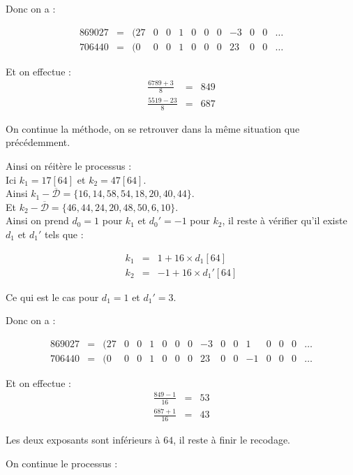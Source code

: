 \documentclass[12pt, a4paper]{memoir}
\newcommand{\dbarre}{\overline{\mathcal{D}}}
\begin{document}
Donc on a :
 
 $$\begin{array}{ccccccccccccc}
  869027 & = & (27 & 0 & 0 & 1 & 0 & 0 & 0 & -3 & 0 & 0 & \ldots \\
  706440 & = & (0 & 0 & 0 & 1 & 0 & 0 & 0 & 23 & 0 & 0 & \ldots
 \end{array}$$
 
 Et on effectue :
 $$\begin{array}{cccccc}
  \frac{6789 + 3}{8} & = & 849 \\
  \frac{5519-23}{8} & = & 687
 \end{array}$$
 
 On continue la méthode, on se retrouver dans la même situation que précédemment.
 
 Ainsi on réitère le processus : \\
 Ici $k_1 = 17 [64]$ et $k_2 = 47 [64]$. \\
Ainsi  $k_1 - \dbarre = \{16,14,58,54,18,20,40,44\}$. \\
Et  $k_2 - \dbarre = \{46,44,24,20,48,50,6,10\}$. \\ 
 Ainsi on prend $d_0 = 1$ pour $k_1$ et $d_0' = -1$ pour $k_2$, il reste à vérifier qu'il existe $d_1$ et 
$d_1'$ tels que :

   $$\begin{array}{ccc}
k_1 & = & 1 + 16 \times d_1[64] \\
k_2 & = & -1 + 16 \times d_1'[64]
 \end{array}$$
 
Ce qui est le cas pour $d_1 = 1$ et $d_1' = 3$.

Donc on a :
 
 $$\begin{array}{ccccccccccccccccc}
  869027 & = & (27 & 0 & 0 & 1 & 0 & 0 & 0 & -3 & 0 & 0 & 1 & 0 & 0 & 0 & \ldots \\
  706440 & = & (0 & 0 & 0 & 1 & 0 & 0 & 0 & 23 & 0 & 0 & -1 & 0 & 0 & 0 & \ldots
 \end{array}$$
 
 Et on effectue :
 $$\begin{array}{cccccc}
  \frac{849 - 1}{16} & = & 53 \\
  \frac{687 + 1}{16} & = & 43
 \end{array}$$
 
 Les deux exposants sont inférieurs à $64$, il reste à finir le recodage.
 
 On continue le processus : \\
 
\end{document}
